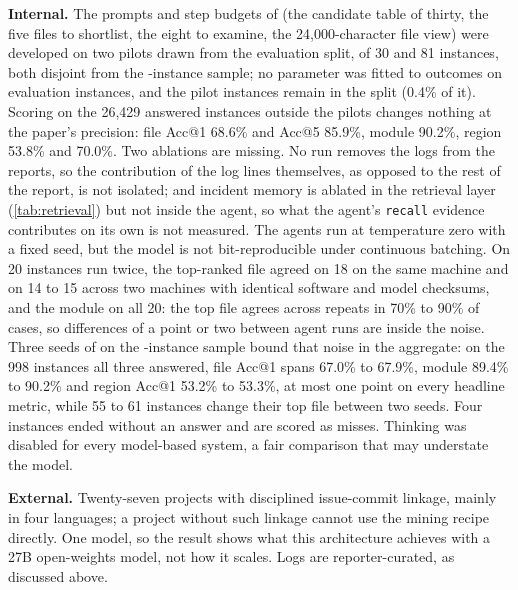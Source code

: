 \textbf{Internal.} The prompts and step budgets of \sys{} (the
candidate table of thirty, the five files to shortlist, the eight to
examine, the 24{,}000-character file view) were developed on two
pilots drawn from the evaluation split, of 30 and 81 instances, both
disjoint from the \nSample-instance sample; no parameter was fitted to outcomes on evaluation instances, and
the pilot instances remain in the split (0.4\% of it). Scoring \sys{}
on the 26{,}429 answered instances outside the pilots changes nothing at the
paper's precision: file Acc@1 68.6\% and Acc@5 85.9\%, module 90.2\%,
region 53.8\% and 70.0\%. Two ablations
are missing. No run removes the logs from the reports, so the
contribution of the log lines themselves, as opposed to the rest of
the report, is not isolated; and incident memory is ablated in the
retrieval layer (\cref{tab:retrieval}) but not inside the agent, so
what the agent's \texttt{recall} evidence contributes on its own is not
measured. The agents run at temperature zero with a fixed seed, but
the model is not bit-reproducible under continuous batching.
On 20 instances run twice, the top-ranked file agreed on 18 on the same
machine and on 14 to 15 across two machines with identical software and
model checksums, and the module on all 20: the top file agrees across
repeats in 70\% to 90\% of cases, so differences of a point or two
between agent runs are inside the noise. Three seeds of \sys{} on
the \nSample-instance sample bound that noise in the aggregate: on the
998 instances all three answered, file Acc@1 spans 67.0\% to 67.9\%,
module 89.4\% to 90.2\% and region Acc@1 53.2\% to 53.3\%, at most
one point on every headline metric, while 55 to 61 instances change
their top file between two seeds. Four instances ended without an answer and are
scored as misses. Thinking was disabled for every model-based system, a
fair comparison that may understate the model.

\textbf{External.} Twenty-seven projects with disciplined issue-commit
linkage, mainly in four languages; a project without such linkage
cannot use the mining recipe directly. One model, so the result shows
what this architecture achieves with a 27B open-weights model, not how
it scales. Logs are
reporter-curated, as discussed above.

